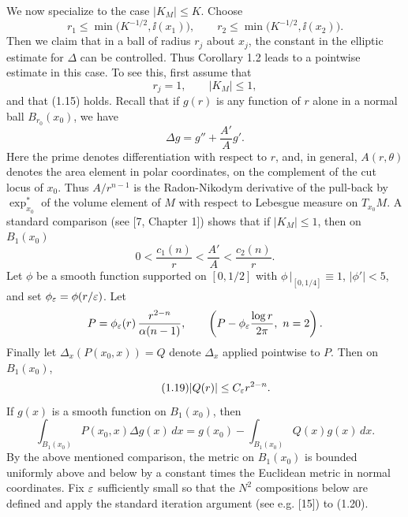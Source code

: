 We now specialize to the case $\lvert K_M\rvert \le K$. Choose
\begin{equation}\tag{1.15}
 r_1\le \min\bigl(K^{-1/2},\ii(x_1)\bigr),\qquad
 r_2\le \min\bigl(K^{-1/2},\ii(x_2)\bigr).
\end{equation}
Then we claim that in a ball of radius $r_j$ about $x_j$, the constant in the
elliptic estimate for $\Delta$ can be controlled. Thus Corollary 1.2 leads to a
pointwise estimate in this case. To see this, first assume that
\begin{equation}\tag{1.16}
 r_j=1,\qquad \lvert K_M\rvert \leq 1,
\end{equation}
and that (1.15) holds. Recall that if $g(r)$ is any function of $r$ alone in a
normal ball $B_{r_0}(x_0)$, we have
\begin{equation}\tag{1.17}
 \Delta g = g'' + \frac{A'}{A}g'.
\end{equation}
Here the prime denotes differentiation with respect to $r$, and, in general,
$A(r,\theta)$ denotes the area element in polar coordinates, on the complement
of the cut locus of $x_0$. Thus $A/r^{n-1}$ is the Radon-Nikodym derivative of
the pull-back by $\exp^*_{x_0}$ of the volume element of $M$ with respect to
Lebesgue measure on $T_{x_0}M$. A standard comparison (see [7, Chapter 1])
shows that if $\lvert K_M\rvert \leq 1$, then on $B_1(x_0)$
\begin{equation}\tag{1.18}
 0<\frac{c_1(n)}{r}<\frac{A'}{A}<\frac{c_2(n)}{r}.
\end{equation}
Let $\phi$ be a smooth function supported on $[0,1/2]$ with
$\phi\,|_{[0,1/4]}\equiv 1$, $|\phi'|<5$, and set $\phi_{\varepsilon}=\phi(r/\varepsilon)$.
Let
\[
 P=\phi_{\varepsilon}(r)\,\frac{r^{2-n}}{\alpha(n-1)},\qquad
\left(P-\phi_{\varepsilon}\frac{\log r}{2\pi},\ n=2\right).
\]
Finally let $\Delta_x(P(x_0,x))=Q$ denote $\Delta_x$ applied pointwise to $P$.
Then on $B_1(x_0)$,
\begin{equation}\tag{1.19}
 |Q(r)|\le C_{\varepsilon}r^{2-n}.
\end{equation}
If $g(x)$ is a smooth function on $B_1(x_0)$, then
\begin{equation}\tag{1.20}
 \int_{B_1(x_0)} P(x_0,x)\Delta g(x)\,dx = g(x_0)-\int_{B_1(x_0)} Q(x)g(x)\,dx.
\end{equation}
By the above mentioned comparison, the metric on $B_1(x_0)$ is bounded
uniformly above and below by a constant times the Euclidean metric in normal
coordinates. Fix $\varepsilon$ sufficiently small so that the $N^2$ compositions below
are defined and apply the standard iteration argument (see e.g. [15]) to (1.20).

